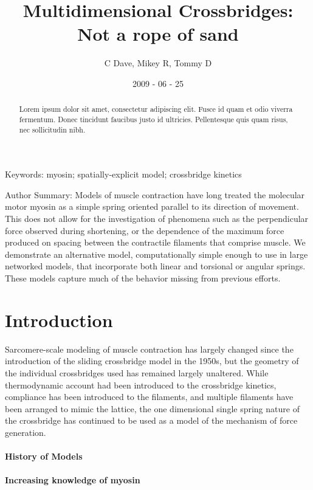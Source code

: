 \documentclass[]{article}
\title{Multidimensional Crossbridges: Not a rope of sand}
\author{C Dave, Mikey R, Tommy D}
\date{2009 - 06 - 25}
\begin{document}
\maketitle

 
\begin{abstract}
	Lorem ipsum dolor sit amet, consectetur adipiscing elit. Fusce id quam et odio viverra fermentum. Donec tincidunt faucibus justo id ultricies. Pellentesque quis quam risus, nec sollicitudin nibh. 
\end{abstract}

Keywords: myosin; spatially-explicit model; crossbridge kinetics

Author Summary: 
Models of muscle contraction have long treated the molecular motor myosin as a simple spring oriented parallel to its direction of movement. 
This does not allow for the investigation of phenomena such as the perpendicular force observed during shortening, or the dependence of the maximum force produced on spacing between the contractile filaments that comprise muscle.
We demonstrate an alternative model, computationally simple enough to use in large networked models, that incorporate both linear and torsional or angular springs. These models capture much of the behavior missing from previous efforts.

\section*{Introduction} %

Sarcomere-scale modeling of muscle contraction has largely changed since the introduction of the sliding crossbridge model in the 1950s, but the geometry of the individual crossbridges used has remained largely unaltered. 
While thermodynamic account had been introduced to the crossbridge kinetics, compliance has been introduced to the filaments, and multiple filaments have been arranged to mimic the lattice, the one dimensional single spring nature of the crossbridge has continued to be used as a model of the mechanism of force generation.

\paragraph*{History of Models}

\paragraph*{Increasing knowledge of myosin}
\end{document}
